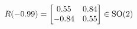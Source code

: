 \documentclass[preview]{standalone}
\begin{document}
\begin{align*}
\special{dvisvgm:raw <g id='unique000'>}R(-0.99) = \begin{bmatrix} 0.55 & 0.84 \\ -0.84 & 0.55 \end{bmatrix} \in \text{SO}(2)\special{dvisvgm:raw </g>}
\end{align*}
\end{document}

